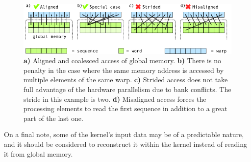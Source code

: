 \documentclass[11pt,twoside]{report}
\begin{document}
\begin{figure}[htbp]
	\begin{center}
  \includegraphics[width=1\textwidth]{img/strided_misaligned.pdf}
	\end{center}
  \caption{{\bf a)} Aligned and coalesced access of global memory. {\bf b)} There is no penalty in the case where the same memory address is accessed by multiple elements of the same warp. {\bf c)} Strided access does not take full advantage of the hardware parallelism due to bank conflicts. The stride in this example is two.  {\bf d)} Misaligned access forces the processing elements to read the first sequence in addition to a great part of the last one.}
	\label{fig:strided_misaligned}
\end{figure}



\indent On a final note, some of the kernel's input data may be of a predictable nature, and it should be considered to reconstruct it within the kernel instead of reading it from global memory.


\end{document}
